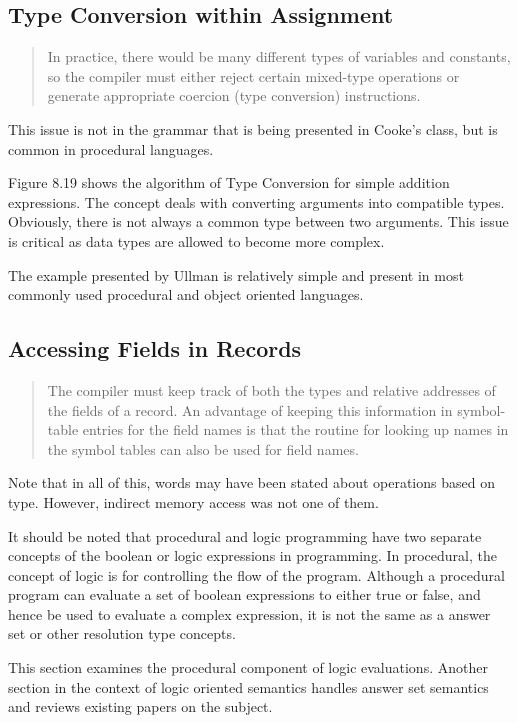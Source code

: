 \documentclass[11pt]{article}
\begin{document}
\subsection {Type Conversion within Assignment}
\begin{quote}
In practice, there would be many different types of variables and constants, so the compiler must either reject certain mixed-type operations or generate appropriate coercion (type conversion) instructions.  
\end{quote}
This issue is not in the grammar that is being presented in Cooke's class, but is common in procedural languages.  

Figure 8.19 shows the algorithm of Type Conversion for simple addition expressions.   The concept deals with converting arguments into compatible types.  Obviously, there is not always a common type between two arguments.   This issue is critical as data types are allowed to become more complex.    

The example presented by Ullman is relatively simple and present in most commonly used procedural and object oriented languages.  


\subsection {Accessing Fields in Records}
\begin{quote}
The compiler must keep track of both the types and relative addresses of the fields of a record.  An advantage of keeping this information in symbol-table entries for the field names is that the routine for looking up names in the symbol tables can also be used for field names.  
\end{quote}



Note that in all of this, words may have been stated about operations based on type.  However, indirect memory access was not one of them.  

It should be noted that procedural and logic programming have two separate concepts of the boolean or logic expressions in programming.     In procedural, the concept of logic is for controlling the flow of the program.  Although a procedural program can evaluate a set of boolean expressions to either true or false, and hence be used to evaluate a complex expression, it is not the same as a answer set or other resolution type concepts.    

This section examines the procedural component of logic evaluations.  Another section in the context of logic oriented semantics handles answer set semantics and reviews existing papers on the subject.  
\end{document}
